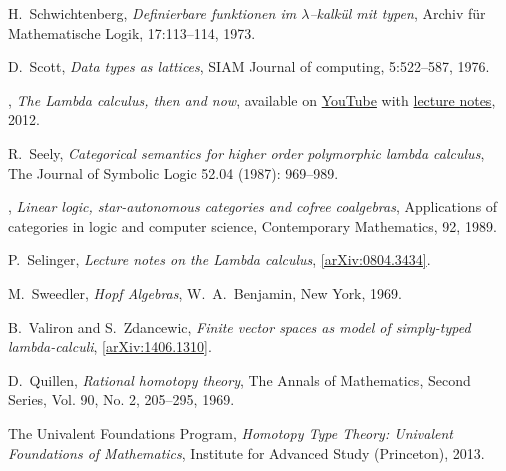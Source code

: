 \documentclass[english,letter paper,12pt,reqno]{article}
\theoremstyle{example}
\numberwithin{equation}{section}
\begin{document}
\begin{thebibliography}{BHLS03}

H.~Schwichtenberg, \textsl{Definierbare funktionen im $\lambda$--kalk\"ul mit typen}, Archiv f\"ur Mathematische Logik, 17:113–114, 1973.

D.~Scott, \textsl{Data types as lattices}, SIAM Journal of computing, 5:522--587, 1976.

\bysame, \textsl{The {L}ambda calculus, then and now}, available on \href{http://www.youtube.com/watch?v=7cPtCpyBPNI}{YouTube} with \href{http://turing100.acm.org/lambda_calculus_timeline.pdf}{lecture notes}, 2012.

R.~Seely, \textsl{Categorical semantics for higher order polymorphic lambda calculus}, The Journal of Symbolic Logic 52.04 (1987): 969--989.

\bysame, \textsl{Linear logic, star-autonomous categories and cofree coalgebras}, Applications of categories in logic and computer science, Contemporary Mathematics, 92, 1989.

P.~Selinger, \textsl{Lecture notes on the {L}ambda calculus}, \href{http://arxiv.org/abs/0804.3434}{[arXiv:0804.3434]}.


  
M.~Sweedler, \textsl{Hopf Algebras}, W.~A.~Benjamin, New York, 1969.

B.~Valiron and S.~Zdancewic, \textsl{Finite vector spaces as model of simply-typed lambda-calculi}, \href{http://arxiv.org/abs/1406.1310v1}{[arXiv:1406.1310]}.

D.~Quillen, \textsl{Rational homotopy theory}, The Annals of Mathematics, Second Series, Vol. 90, No. 2, 205--295, 1969.

The Univalent Foundations Program, \textsl{Homotopy {T}ype {T}heory: {U}nivalent {F}oundations of {M}athematics}, Institute for Advanced Study (Princeton), 2013.

  

\end{thebibliography}
\end{document}
